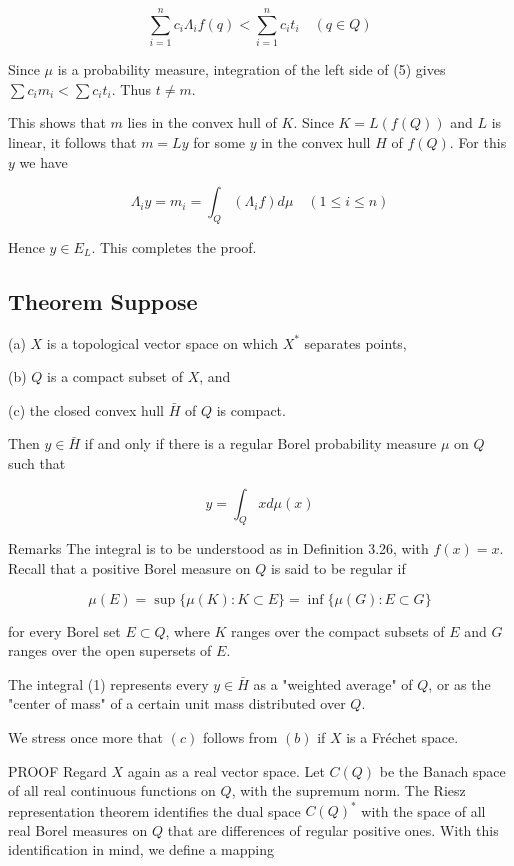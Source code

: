 \documentclass[10pt]{article}
\begin{document}
$$
\sum_{i=1}^{n} c_{i} \Lambda_{i} f(q)<\sum_{i=1}^{n} c_{i} t_{i} \quad(q \in Q)
$$

Since $\mu$ is a probability measure, integration of the left side of (5) gives $\sum c_{i} m_{i}<\sum c_{i} t_{i}$. Thus $t \neq m$.

This shows that $m$ lies in the convex hull of $K$. Since $K=L(f(Q))$ and $L$ is linear, it follows that $m=L y$ for some $y$ in the convex hull $H$ of $f(Q)$. For this $y$ we have

$$
\Lambda_{i} y=m_{i}=\int_{Q}\left(\Lambda_{i} f\right) d \mu \quad(1 \leq i \leq n)
$$

Hence $y \in E_{L}$. This completes the proof.

\subsection{Theorem Suppose}
(a) $X$ is a topological vector space on which $X^{*}$ separates points,

(b) $Q$ is a compact subset of $X$, and

(c) the closed convex hull $\bar{H}$ of $Q$ is compact.

Then $y \in \bar{H}$ if and only if there is a regular Borel probability measure $\mu$ on $Q$ such that

$$
y=\int_{Q} x d \mu(x)
$$

Remarks The integral is to be understood as in Definition 3.26, with $f(x)=x$. Recall that a positive Borel measure on $Q$ is said to be regular if

$$
\mu(E)=\sup \{\mu(K): K \subset E\}=\inf \{\mu(G): E \subset G\}
$$

for every Borel set $E \subset Q$, where $K$ ranges over the compact subsets of $E$ and $G$ ranges over the open supersets of $E$.

The integral (1) represents every $y \in \bar{H}$ as a "weighted average" of $Q$, or as the "center of mass" of a certain unit mass distributed over $Q$.

We stress once more that $(c)$ follows from $(b)$ if $X$ is a Fréchet space.

PROOF Regard $X$ again as a real vector space. Let $C(Q)$ be the Banach space of all real continuous functions on $Q$, with the supremum norm. The Riesz representation theorem identifies the dual space $C(Q)^{*}$ with the space of all real Borel measures on $Q$ that are differences of regular positive ones. With this identification in mind, we define a mapping
\end{document}
